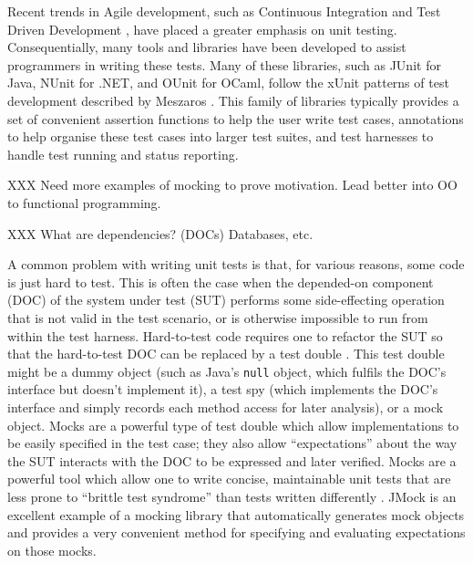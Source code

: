 \documentclass[proposal]{softeng}
\begin{document}

Recent trends in Agile development, such as Continuous Integration
\cite{humble:continuous} and Test Driven Development \cite{beck:tdd},
have placed a greater emphasis on unit testing. Consequentially, many
tools and libraries have been developed to assist programmers in
writing these tests. Many of these libraries, such as JUnit
\cite{www:junit} for Java, NUnit \cite{www:nunit} for .NET, and OUnit
\cite{www:ounit} for OCaml, follow the xUnit patterns of test
development described by Meszaros \cite{meszaros:xunit}. This family
of libraries typically provides a set of convenient assertion
functions to help the user write test cases, annotations to help
organise these test cases into larger test suites, and test harnesses
to handle test running and status reporting.

XXX Need more examples of mocking to prove motivation. Lead better
into OO to functional programming.

XXX What are dependencies? (DOCs) Databases, etc.

A common problem with writing unit tests is that, for various reasons,
some code is just hard to test. This is often the case when the
depended-on component (DOC) of the system under test (SUT) performs
some side-effecting operation that is not valid in the test scenario,
or is otherwise impossible to run from within the test
harness. Hard-to-test code requires one to refactor the SUT so that
the hard-to-test DOC can be replaced by a test double
\cite{meszaros:xunit}. This test double might be a dummy object (such
as Java's \verb|null| object, which fulfils the DOC's interface but
doesn't implement it), a test spy (which implements the DOC's
interface and simply records each method access for later analysis),
or a mock object. Mocks are a powerful type of test double which allow
implementations to be easily specified in the test case; they also
allow ``expectations'' about the way the SUT interacts with the DOC to
be expressed and later verified. Mocks are a powerful tool which allow
one to write concise, maintainable unit tests that are less prone to
``brittle test syndrome'' than tests written differently
\cite{meszaros:xunit}. JMock \cite{www:jmock} is an excellent example
of a mocking library that automatically generates mock objects and
provides a very convenient method for specifying and evaluating
expectations on those mocks.
\end{document}
